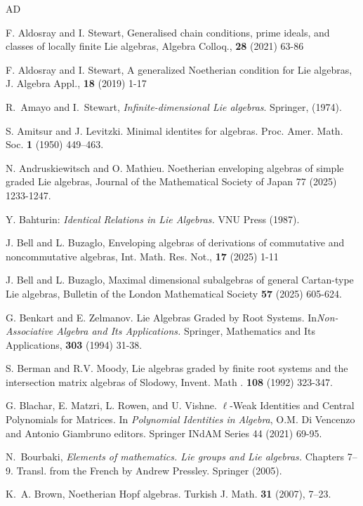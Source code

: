 \documentclass[11pt, letterpaper, reqno]{amsart}
\theoremstyle{definition}
\begin{document}
\begin{thebibliography}{AD}

 F. Aldosray and I.  Stewart, Generalised chain conditions, prime ideals, and classes of locally finite Lie algebras, Algebra Colloq., {\bf 28} (2021) 63-86
	
 F. Aldosray and I.  Stewart,
A generalized Noetherian condition for Lie algebras,
J. Algebra Appl., {\bf 18} (2019) 1-17
	

 R.~Amayo and I.~Stewart, {\it Infinite-dimensional Lie algebras}. Springer,  (1974).

S. Amitsur and J. Levitzki. Minimal identites for algebras. Proc. Amer. Math. Soc. {\bf 1} (1950) 449–463.

  N. Andruskiewitsch and O. Mathieu.
 Noetherian enveloping algebras of simple graded Lie algebras,
 Journal of the Mathematical Society of Japan  77 (2025) 1233-1247.
 
Y. Bahturin: {\it Identical Relations in Lie Algebras.} VNU Press (1987).

  J. Bell and L. Buzaglo,
Enveloping algebras of derivations of commutative and noncommutative algebras,
Int. Math. Res. Not., {\bf 17} (2025) 1-11

  J. Bell and L. Buzaglo,
Maximal dimensional subalgebras of general Cartan-type Lie algebras, Bulletin of the London Mathematical Society
{\bf 57} (2025) 605-624.

	
G. Benkart and E. Zelmanov. Lie Algebras Graded by Root Systems. In{\it Non-Associative Algebra and Its Applications.} Springer, Mathematics and Its Applications,  {\bf 303}
(1994) 31-38.

S. Berman and R.V. Moody, Lie algebras graded by finite root systems and the intersection
matrix algebras of Slodowy, Invent. Math . {\bf 108} (1992) 323-347.

G. Blachar, E. Matzri, L. Rowen, and U. Vishne.
$\ell$-Weak Identities and Central
Polynomials for Matrices.
In {\it Polynomial Identities in Algebra}, O.M. Di Vencenzo and Antonio
Giambruno editors.  Springer INdAM Series 44 (2021) 69-95.


N.~Bourbaki, {\it Elements of mathematics. Lie groups and Lie algebras.} Chapters 7--9. Transl. from the French by Andrew Pressley. Springer (2005).

K.~A. Brown, Noetherian Hopf algebras. Turkish J. Math. \textbf{31} (2007), 7--23.


\end{thebibliography}
\end{document}

